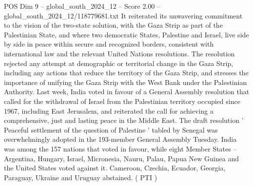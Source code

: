 \begin{textsample}{POS Dim 9 – global\_south\_2024\_12 – Score 2.00 – global\_south\_2024\_12/118779681.txt}
It reiterated its unwavering commitment to the vision of the two-state solution, with the Gaza Strip as part of the Palestinian State, and where two democratic States, Palestine and Israel, live side by side in peace within secure and recognized borders, consistent with international law and the relevant United Nations resolutions.
The resolution rejected any attempt at demographic or territorial change in the Gaza Strip, including any actions that reduce the territory of the Gaza Strip, and stresses the importance of unifying the Gaza Strip with the West Bank under the Palestinian Authority.
Last week, India voted in favour of a General Assembly resolution that called for the withdrawal of Israel from the Palestinian territory occupied since 1967, including East Jerusalem, and reiterated the call for achieving a comprehensive, just and lasting peace in the Middle East.
The draft resolution ' Peaceful settlement of the question of Palestine ' tabled by Senegal was overwhelmingly adopted in the 193-member General Assembly Tuesday.
India was among the 157 nations that voted in favour, while eight Member States -- Argentina, Hungary, Israel, Micronesia, Nauru, Palau, Papua New Guinea and the United States voted against it.
Cameroon, Czechia, Ecuador, Georgia, Paraguay, Ukraine and Uruguay abstained. ( PTI )

\end{textsample}
